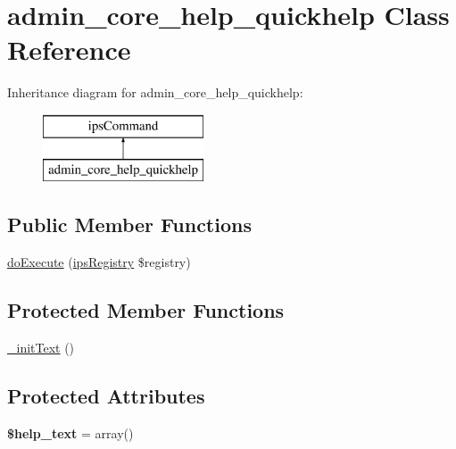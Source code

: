 \hypertarget{classadmin__core__help__quickhelp}{\section{admin\-\_\-core\-\_\-help\-\_\-quickhelp Class Reference}
\label{classadmin__core__help__quickhelp}
}
Inheritance diagram for admin\-\_\-core\-\_\-help\-\_\-quickhelp\-:\begin{figure}[H]
\begin{center}
\leavevmode
\includegraphics[height=2.000000cm]{classadmin__core__help__quickhelp}
\end{center}
\end{figure}
\subsection*{Public Member Functions}
\begin{DoxyCompactItemize}
\item 
\hyperlink{classadmin__core__help__quickhelp_afbc4e912a0604b94d47d66744c64d8ba}{do\-Execute} (\hyperlink{classips_registry}{ips\-Registry} \$registry)
\end{DoxyCompactItemize}
\subsection*{Protected Member Functions}
\begin{DoxyCompactItemize}
\item 
\hyperlink{classadmin__core__help__quickhelp_afeeb5b801029207b52e75fd6010e81e6}{\-\_\-init\-Text} ()
\end{DoxyCompactItemize}
\subsection*{Protected Attributes}
\begin{DoxyCompactItemize}
\item 
\hypertarget{classadmin__core__help__quickhelp_a5372d6e3efec0f0d7f50f6c47fe74ee1}{{\bfseries \$help\-\_\-text} = array()}\label{classadmin__core__help__quickhelp_a5372d6e3efec0f0d7f50f6c47fe74ee1}

\end{DoxyCompactItemize}
